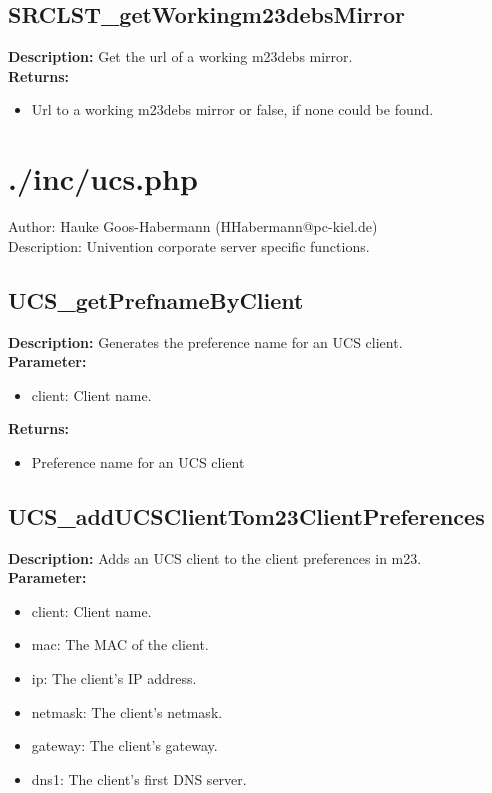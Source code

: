 \subsection{SRCLST\_getWorkingm23debsMirror}
\textbf{Description:} Get the url of a working m23debs mirror.\\
\textbf{Returns:}
\begin{itemize}
\item Url to a working m23debs mirror or false, if none could be found.
\end{itemize}

\newpage\section{./inc/ucs.php}
 Author: Hauke Goos-Habermann (HHabermann@pc-kiel.de)\\
 Description: Univention corporate server specific functions.\\

\subsection{UCS\_getPrefnameByClient}
\textbf{Description:} Generates the preference name for an UCS client.\\
\textbf{Parameter:}
\begin{itemize}
\item client: Client name.
\end{itemize}
\textbf{Returns:}
\begin{itemize}
\item Preference name for an UCS client
\end{itemize}

\subsection{UCS\_addUCSClientTom23ClientPreferences}
\textbf{Description:} Adds an UCS client to the client preferences in m23.\\
\textbf{Parameter:}
\begin{itemize}
\item client: Client name.
\item mac: The MAC of the client.
\item ip: The client's IP address.
\item netmask: The client's netmask.
\item gateway: The client's gateway.
\item dns1: The client's first DNS server.
\end{itemize}

